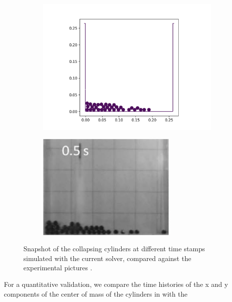 \begin{figure}[!htpb]
  \begin{subfigure}{0.48\textwidth}
    \centering
    \includegraphics[width=1.0\textwidth]{figures/rfc/figures/stack_of_cylinders_2d/Mohseni_Vyas/time3}
  \end{subfigure}
  \begin{subfigure}{0.48\textwidth}
    \centering
    \includegraphics[width=0.75\textwidth]{images/rfc/images/stack_of_cylinders_experimental_images/time3}
  \end{subfigure}
  \caption{Snapshot of the collapsing cylinders at different time stamps
    simulated with the current solver, compared against the experimental
    pictures \parencite{zhang_simulation_2009}.}
\label{fig:snapshots-stack-of-cylinders}
\end{figure}
For a quantitative validation, we compare the time histories of the x and y
components of the center of mass of the cylinders in
 with the
